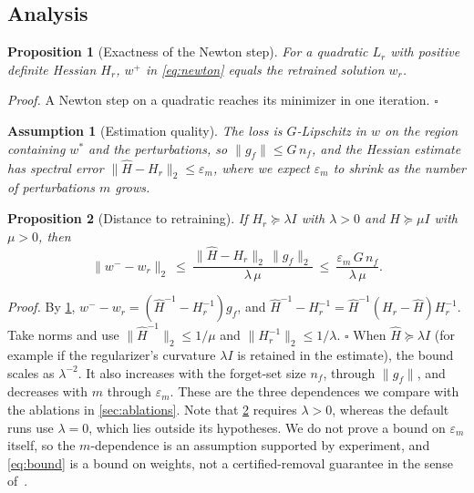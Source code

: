 \documentclass[10pt,twocolumn,letterpaper]{article}
\newtheorem{proposition}{Proposition}
\newtheorem{assumption}{Assumption}
\begin{document}
\subsection{Analysis}
\label{sec:analysis}
\begin{proposition}[Exactness of the Newton step]
\label{prop:exact}
For a quadratic $L_r$ with positive definite Hessian $H_r$, $w^{+}$ in \cref{eq:newton} equals the retrained solution $w_r$.
\end{proposition}
\noindent\emph{Proof.} 
A Newton step on a quadratic reaches its minimizer in one iteration.
\hfill$\square$

\begin{assumption}[Estimation quality]
\label{as:est}
The loss is $G$-Lipschitz in $w$ on the region containing $w^*$ and the perturbations, so $\|g_f\|\le G\,n_f$, and the Hessian estimate has spectral error $\|\widehat H-H_r\|_2\le\varepsilon_m$, where we expect $\varepsilon_m$ to shrink as the number of perturbations $m$ grows.
\end{assumption}

\begin{proposition}[Distance to retraining]
\label{prop:bound}
If $H_r\succeq\lambda I$ with $\lambda>0$ and $\widehat H\succeq\mu I$ with $\mu>0$, then
\begin{equation}
  \|w^{-}-w_r\|_2\ \le\ \frac{\|\widehat H-H_r\|_2\,\|g_f\|_2}{\lambda\,\mu}\ \le\ \frac{\varepsilon_m\,G\,n_f}{\lambda\,\mu}.
  \label{eq:bound}
\end{equation}
\end{proposition}
\noindent\emph{Proof.} 
By \cref{prop:exact}, $w^{-}-w_r=(\widehat H^{-1}-H_r^{-1})g_f$, and $\widehat H^{-1}-H_r^{-1}=\widehat H^{-1}(H_r-\widehat H)H_r^{-1}$.
Take norms and use $\|\widehat H^{-1}\|_2\le 1/\mu$ and $\|H_r^{-1}\|_2\le1/\lambda$.
\hfill$\square$
When $\widehat H\succeq\lambda I$ (for example if the regularizer's curvature $\lambda I$ is retained in the estimate), the bound scales as $\lambda^{-2}$.
It also increases with the forget-set size $n_f$, through $\|g_f\|$, and decreases with $m$ through $\varepsilon_m$.
These are the three dependences we compare with the ablations in \cref{sec:ablations}.
Note that \cref{prop:bound} requires $\lambda>0$, whereas the default runs use $\lambda=0$, which lies outside its hypotheses.
We do not prove a bound on $\varepsilon_m$ itself, so the $m$-dependence is an assumption supported by experiment, and \cref{eq:bound} is a bound on weights, not a certified-removal guarantee in the sense of~\cite{guo2020}.
\end{document}
